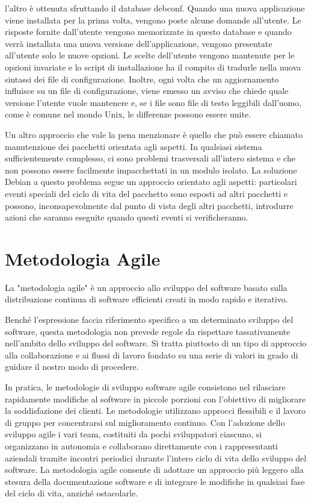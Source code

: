 \documentclass[a4paper,12pt,titlepage,oneside]{book}
\begin{document}
    l'altro è ottenuta sfruttando il database debconf. Quando una nuova applicazione viene installata per la prima volta, vengono poste alcune domande all'utente. Le risposte fornite dall'utente
    vengono memorizzate in questo database e quando verrà installata una nuova versione dell'applicazione, vengono presentate all'utente solo le nuove opzioni.
    Le scelte dell'utente vengono mantenute per le opzioni invariate e lo script di installazione ha il compito di tradurle nella nuova sintassi dei file di configurazione. Inoltre, ogni volta che un aggiornamento influisce su un file di configurazione, 
    viene emesso un avviso che chiede quale versione l'utente vuole mantenere e, se i file sono file di testo leggibili dall'uomo, come è comune nel mondo Unix, le differenze possono essere unite. 

    Un altro approccio che vale la pena menzionare è quello che può essere chiamato manutenzione dei pacchetti orientata agli aspetti.
    In qualsiasi sistema sufficientemente complesso, ci sono problemi trasversali all'intero sistema e che non possono essere facilmente
    impacchettati in un modulo isolato. La soluzione Debian a questo problema segue un approccio orientato agli aspetti: particolari eventi speciali del ciclo di vita del pacchetto sono esposti ad altri
    pacchetti e possono, inconsapevolmente dal punto di vista degli altri pacchetti, introdurre azioni che saranno eseguite quando questi eventi si verificheranno. 

\chapter{Metodologia Agile}
    La "metodologia agile" è un approccio allo sviluppo del software basato sulla distribuzione continua di software efficienti creati in modo rapido e iterativo. 
    
    Benché l'espressione faccia riferimento specifico a un determinato sviluppo del software, questa metodologia non prevede regole da rispettare tassativamente nell'ambito dello sviluppo del software. Si tratta piuttosto di un tipo di approccio alla collaborazione e ai 
    flussi di lavoro fondato su una serie di valori in grado di guidare il nostro modo di procedere.
    
    In pratica, le metodologie di sviluppo software agile consistono nel rilasciare rapidamente modifiche al software in piccole porzioni con l'obiettivo di migliorare la soddisfazione dei clienti. Le metodologie utilizzano approcci flessibili e il lavoro di 
    gruppo per concentrarsi sul miglioramento continuo. Con l'adozione dello sviluppo agile i vari team, costituiti da pochi sviluppatori ciascuno, si organizzano in autonomia e collaborano direttamente con i rappresentanti aziendali tramite incontri periodici durante 
    l'intero ciclo di vita dello sviluppo del software. La metodologia agile consente di adottare un approccio più leggero alla stesura della documentazione software e di integrare le modifiche in qualsiasi fase del ciclo di vita, anziché ostacolarle.
\end{document}
